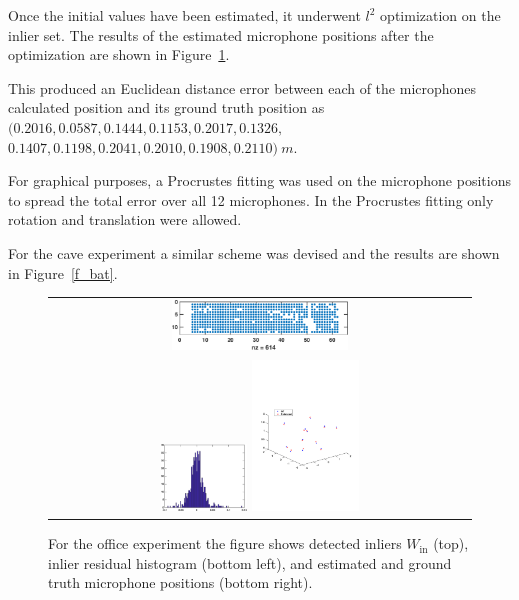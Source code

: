 \documentclass{article}
\def\Win{W_{\text{in}}}
\begin{document}
Once the initial values have been estimated, it underwent $l^{2}$ optimization on the inlier set. The results of the estimated microphone positions after the optimization are shown in Figure~\ref{f_454H}. 

This produced an Euclidean distance error between each of the microphones calculated position and its ground truth position as $(0.2016,0.0587,0.1444,0.1153,0.2017, 0.1326, $ $0.1407, 0.1198,0.2041,0.2010,0.1908,0.2110)~ m$.

For graphical purposes, a Procrustes fitting was used on the microphone positions to spread the total error over all 12 microphones. In the Procrustes fitting only rotation and translation were allowed.

For the cave experiment a similar scheme was devised and the results are shown in Figure~\ref{f_bat}.

\begin{figure}
\begin{tabular}{c}
\includegraphics[width=0.43\textwidth]{figs/MH454_F_inl.eps} \\
\includegraphics[width=0.21\textwidth]{figs/MH454_F_res.eps} 
\includegraphics[width=0.26\textwidth]{figs/MH454_F_fig_new.pdf} 
\end{tabular}
\caption{For the office experiment the figure shows  detected inliers $\Win$ (top),  inlier residual histogram (bottom left), and  estimated and ground truth microphone positions (bottom right).}
\label{f_454H}
\end{figure}
\end{document}
